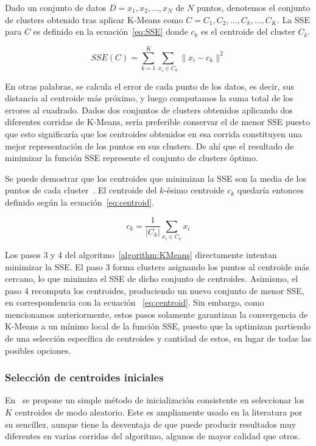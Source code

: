 Dado un conjunto de datos $D={x_1,x_2,\dots,x_N}$ de $N$ puntos, denotemos el conjunto de clusters obtenido tras aplicar K-Means como $C={C_1,C_2,\dots,C_k,\dots,C_K}$.
La SSE para $C$ es definido en la ecuación~\ref{eq:SSE} donde $c_k$ es el centroide del cluster $C_k$.

\begin{equation}
    \label{eq:SSE}
    SSE(C)=\sum_{k=1}^{K}{\sum_{x_{i}\in C_k}{\|x_i-c_k\|^2}}
\end{equation}

En otras palabras, se calcula el error de cada punto de los datos, es decir, sus distancia al centroide más próximo, y luego computamos la suma total de los errores al cuadrado.
Dados dos conjuntos de clusters obtenidos aplicando dos diferentes corridas de K-Means, sería preferible conservar el de menor SSE puesto que esto significaría que los centroides obtenidos en esa corrida constituyen una mejor representación de los puntos en sus clusters.
De ahí que el resultado de minimizar la función SSE represente el conjunto de clusters óptimo.

Se puede demostrar que los centroides que minimizan la SSE son la media de los puntos de cada cluster~\cite{Unknown}.
El centroide del $k$-ésimo centroide $c_k$ quedaría entonces definido según la ecuación~\ref{eq:centroid}.

\begin{equation}
    \label{eq:centroid}
    c_{k}=\frac{1}{|C_k|}\sum_{x_{i}\in C_k}{x_i}
\end{equation}

Los pasos 3 y 4 del algoritmo~\ref{algorithm:KMeans} directamente intentan minimizar la SSE. El paso 3 forma clusters asignando los puntos al centroide más cercano, lo que minimiza el SSE de dicho conjunto de centroides.
Asimismo, el paso 4 recomputa los centroides, produciendo un nuevo conjunto de menor SSE, en correspondencia con la ecuación ~\ref{eq:centroid}.
Sin embargo, como mencionamos anteriormente, estos pasos solamente garantizan la convergencia de K-Means a un mínimo local de la función SSE, puesto que la optimizan partiendo de una selección específica de centroides y cantidad de estos, en lugar de todas las posibles opciones.

\subsubsection{Selección de centroides iniciales}

En~\cite{MacQueen67} se propone un simple método de inicialización consistente en seleccionar los $K$ centroides de modo aleatorio.
Este es ampliamente usado en la literatura por su sencillez, aunque tiene la desventaja de que puede producir resultados muy diferentes en varias corridas del algoritmo, algunos de mayor calidad que otros.

